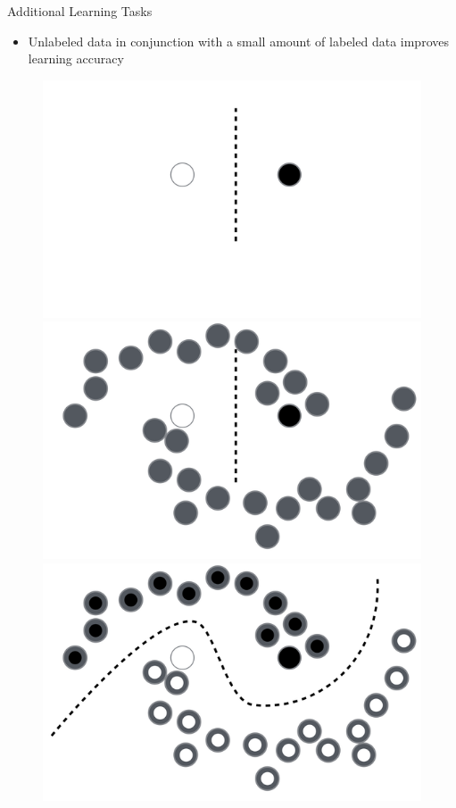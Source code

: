 \documentclass[11pt,compress,t,notes=noshow, xcolor=table]{beamer}
\begin{document}
\begin{vbframe}{Additional Learning Tasks}
\begin{itemize}
  \item Unlabeled data in conjunction with a small amount of labeled data 
  improves learning accuracy

\end{itemize}
\lz
    \begin{figure}[!htb]
    \includegraphics[width=\linewidth]{figure_man/semi1.png}
  \endminipage\hfill
    \includegraphics[width=\linewidth]{figure_man/semi3.png}
  \endminipage\hfill
    \includegraphics[width=\linewidth]{figure_man/semi7.png}
  \endminipage
  \end{figure}
\framebreak


\end{vbframe}
\end{document}
